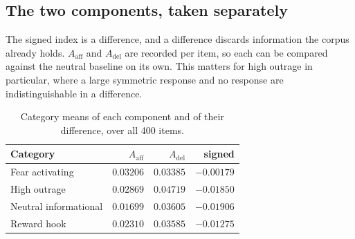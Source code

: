 \subsection{The two components, taken separately}
\label{sec:components}

The signed index is a difference, and a difference discards information the corpus already
holds. $A_{\mathrm{aff}}$ and $A_{\mathrm{del}}$ are recorded per item, so each can be compared
against the neutral baseline on its own. This matters for high outrage in particular, where a
large symmetric response and no response are indistinguishable in a difference.

\begin{table}[htbp]
\centering
\begin{tabular}{@{}lrrr@{}}
\toprule
\textbf{Category} & $A_{\mathrm{aff}}$ & $A_{\mathrm{del}}$ & \textbf{signed} \\
\midrule
Fear activating       & $0.03206$ & $0.03385$ & $-0.00179$ \\
High outrage          & $0.02869$ & $0.04719$ & $-0.01850$ \\
Neutral informational & $0.01699$ & $0.03605$ & $-0.01906$ \\
Reward hook           & $0.02310$ & $0.03585$ & $-0.01275$ \\
\bottomrule
\end{tabular}
\caption{Category means of each component and of their difference, over all 400 items.}
\label{tab:components}
\end{table}

